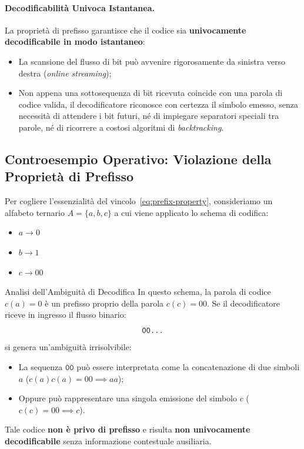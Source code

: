 \paragraph{Decodificabilit\`a Univoca Istantanea.}
La propriet\`a di prefisso garantisce che il codice sia \textbf{univocamente decodificabile in modo istantaneo}:
\begin{itemize}
  \item La scansione del flusso di bit pu\`o avvenire rigorosamente da sinistra verso destra (\textit{online streaming});
  \item Non appena una sottosequenza di bit ricevuta coincide con una parola di codice valida, il decodificatore riconosce con certezza il simbolo emesso, senza necessit\`a di attendere i bit futuri, n\'e di impiegare separatori speciali tra parole, n\'e di ricorrere a costosi algoritmi di \textit{backtracking}.
\end{itemize}

\FloatBarrier
\subsection{Controesempio Operativo: Violazione della Propriet\`a di Prefisso}
\label{subsec:controesempio-prefisso}

Per cogliere l'essenzialit\`a del vincolo~\eqref{eq:prefix-property}, consideriamo un alfabeto ternario $A = \{a, b, c\}$ a cui viene applicato lo schema di codifica:
\begin{itemize}
  \item $a \to 0$
  \item $b \to 1$
  \item $c \to 00$
\end{itemize}

\begin{alertblock}{Analisi dell'Ambiguit\`a di Decodifica}
In questo schema, la parola di codice $c(a) = 0$ \`e un prefisso proprio della parola $c(c) = 00$.
Se il decodificatore riceve in ingresso il flusso binario:
\begin{equation}
  \texttt{00\dots}
\end{equation}
si genera un'ambiguit\`a irrisolvibile:
\begin{itemize}
  \item La sequenza $\texttt{00}$ pu\`o essere interpretata come la concatenazione di due simboli $a$ ($c(a)c(a) = 00 \implies aa$);
  \item Oppure pu\`o rappresentare una singola emissione del simbolo $c$ ($c(c) = 00 \implies c$).
\end{itemize}
Tale codice \textbf{non \`e privo di prefisso} e risulta \textbf{non univocamente decodificabile} senza informazione contestuale ausiliaria.
\end{alertblock}

